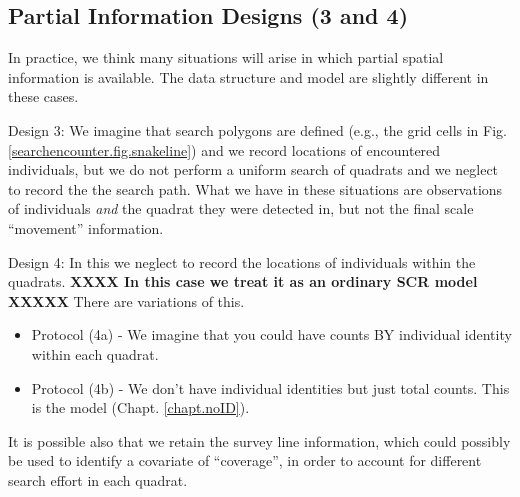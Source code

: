 
\subsection{Partial Information Designs (3 and 4)}

In practice, we think many situations will arise in which partial
spatial information is available. The data structure and model are
slightly different in these cases.

Design 3: We imagine that search polygons are defined
(e.g., the grid cells in Fig. \ref{searchencounter.fig.snakeline}) and
we record
locations of encountered individuals, but we do not perform a uniform search
of quadrats and we neglect to record the the search path. 
What we have in these situations are
observations of individuals {\it and} the quadrat they were detected in,
but not the final 
scale ``movement'' information. 


Design 4:
In this
we neglect to record the locations of 
individuals within the quadrats.
{\bf XXXX In this case we treat it as an ordinary SCR model XXXXX}
There are variations of this.
\begin{itemize}
\item[] Protocol (4a) - We imagine that you could have
counts BY individual identity within each quadrat.
\item[] Protocol (4b) - We don't have
individual identities but just total counts. This is the
\citet{chandler_royle:2013} model (Chapt. \ref{chapt.noID}).
\end{itemize}
It is possible also that we retain the survey line information, which
could possibly be used to identify a covariate of ``coverage'', in order to account for different search effort in each quadrat. 




